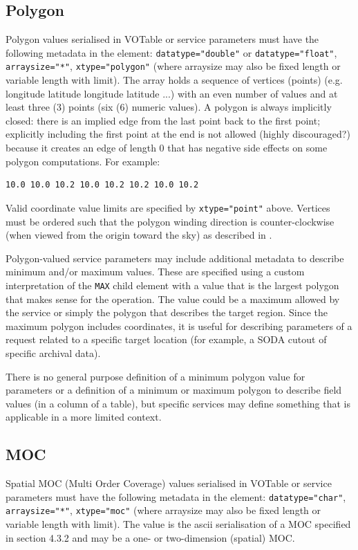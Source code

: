 \documentclass[11pt,letter]{ivoa}
\begin{document}
\subsection{Polygon}
Polygon values serialised in VOTable or service parameters must have the following metadata in the
 element: \verb|datatype="double"| or \verb|datatype="float"|,  \verb|arraysize="*"|, \verb|xtype="polygon"|
(where arraysize may also be fixed length or variable length with limit).
The array holds a sequence of vertices (points) (e.g. longitude latitude longitude
latitude ...) with an even number of values and at least three (3) points (six
(6) numeric values). A polygon is always implicitly closed: there is an implied edge from
the last point back to the first point; explicitly including the first point at the end is
not allowed (highly discouraged?) because it creates an edge of length 0 that has
negative side effects on some polygon computations. For example:

\begin{verbatim}
10.0 10.0 10.2 10.0 10.2 10.2 10.0 10.2
\end{verbatim}

Valid coordinate value limits are specified by \verb|xtype="point"| above. 
Vertices must be ordered such that the polygon
winding direction is counter-clockwise (when viewed from the origin toward the
sky) as described in \citep{2007ivoa.spec.1030R}.

Polygon-valued service parameters may include additional metadata to describe minimum
and/or maximum values. These are specified using a custom interpretation of the
\verb|MAX| child element with a value that is the largest polygon that makes sense
for the operation. The value could be a maximum allowed by the service or simply
the polygon that describes the target region. Since the maximum polygon includes
coordinates, it is useful for describing parameters of a request related
to a specific target location (for example, a SODA cutout of specific archival data).

There is no general purpose definition of a minimum polygon value for parameters or
a definition of a minimum or maximum polygon to describe field values (in a column
of a table), but specific services may define something that is applicable in a
more limited context.

\subsection{MOC}
Spatial MOC (Multi Order Coverage) values serialised in VOTable or service parameters must
have the following metadata in the  element:
\verb|datatype="char"|, \verb|arraysize="*"|, \verb|xtype="moc"|
(where arraysize may also be fixed length or variable length with limit).
The value is the ascii serialisation of a MOC specified in \citet{2022ivoa.spec.0727F}
section 4.3.2 and may be a one- or two-dimension (spatial) MOC.
\end{document}
